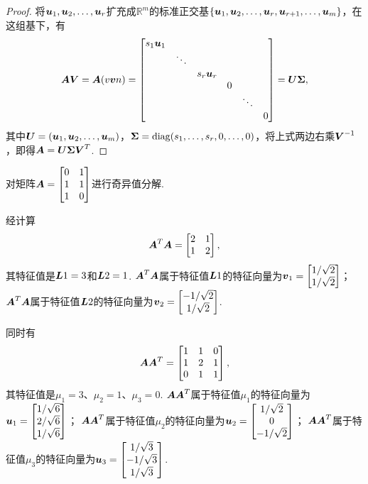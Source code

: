 \begin{theorem}
\begin{proof}
将\(\boldsymbol{u}_1,\boldsymbol{u}_2,\dotsc,\boldsymbol{u}_r\)扩充成\(\mathbb{R}^m\)的标准正交基\(\{\boldsymbol{u}_1,\boldsymbol{u}_2,\dotsc,\boldsymbol{u}_r,\boldsymbol{u}_{r+1},\dotsc,\boldsymbol{u}_m\}\)，在这组基下，有\[
\A\Q = \A(\v{\q}{n}) = \begin{bmatrix}
s_1 \p_1 \\
& \ddots \\
& & s_r \p_r \\
& & & 0 \\
& & & & \ddots \\
& & & & & 0
\end{bmatrix}
= \P \S,
\]其中\(\P = (\p_1,\p_2,\dotsc,\p_m)\)，\(\S = \diag(s_1,\dotsc,s_r,0,\dotsc,0)\)，将上式两边右乘\(\Q^{-1}\)，即得\(\A = \P\S\Q^T\).
\end{proof}
\end{theorem}

\begin{example}
\def\U{\mat{U}}
\def\S{\mat{\Sigma}}
\def\V{\mat{V}}
\def\M#1{\mu_{#1}}
对矩阵\(\boldsymbol{A} = \begin{bmatrix} 0 & 1 \\ 1 & 1 \\ 1 & 0 \end{bmatrix}\)进行奇异值分解.
\begin{solution}
经计算\[
\boldsymbol{A}^T \boldsymbol{A} = \begin{bmatrix} 2 & 1 \\ 1 & 2 \end{bmatrix},
\]其特征值是\(\boldsymbol{L}{1} = 3\)和\(\boldsymbol{L}{2} = 1\).
\(\boldsymbol{A}^T \boldsymbol{A}\)属于特征值\(\boldsymbol{L}{1}\)的特征向量为\(\boldsymbol{v}_1 = \begin{bmatrix} 1/\sqrt{2} \\ 1/\sqrt{2} \end{bmatrix}\)；
\(\boldsymbol{A}^T \boldsymbol{A}\)属于特征值\(\boldsymbol{L}{2}\)的特征向量为\(\boldsymbol{v}_2 = \begin{bmatrix} -1/\sqrt{2} \\ 1/\sqrt{2} \end{bmatrix}\).

同时有\[
\boldsymbol{A} \boldsymbol{A}^T = \begin{bmatrix} 1 & 1 & 0 \\ 1 & 2 & 1 \\ 0 & 1 & 1 \end{bmatrix},
\]其特征值是\(\M{1} = 3\)、\(\M{2} = 1\)、\(\M{3} = 0\).
\(\boldsymbol{A} \boldsymbol{A}^T\)属于特征值\(\M{1}\)的特征向量为\(\boldsymbol{u}_1 = \begin{bmatrix} 1/\sqrt{6} \\ 2/\sqrt{6} \\ 1/\sqrt{6} \end{bmatrix}\)；
\(\boldsymbol{A} \boldsymbol{A}^T\)属于特征值\(\M{2}\)的特征向量为\(\boldsymbol{u}_2 = \begin{bmatrix} 1/\sqrt{2} \\ 0 \\ -1/\sqrt{2} \end{bmatrix}\)；
\(\boldsymbol{A} \boldsymbol{A}^T\)属于特征值\(\M{3}\)的特征向量为\(\boldsymbol{u}_3 = \begin{bmatrix} 1/\sqrt{3} \\ -1/\sqrt{3} \\ 1/\sqrt{3} \end{bmatrix}\).


\end{solution}
\end{example}
